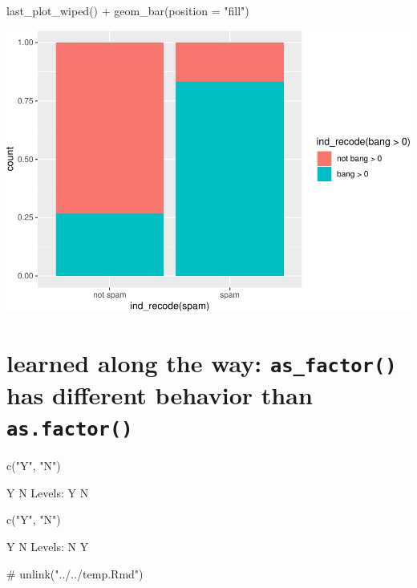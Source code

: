 \begin{Schunk}
\begin{Sinput}
{}

last_plot_wiped() +
  geom_bar(position = "fill")
\end{Sinput}

\includegraphics[width=0.69\linewidth]{r_journal_files/figure-latex/unnamed-chunk-19-2} \end{Schunk}

\hypertarget{learned-along-the-way-as_factor-has-different-behavior-than-as.factor}{%
\section{\texorpdfstring{learned along the way: \texttt{as\_factor()}
has different behavior than
\texttt{as.factor()}}{learned along the way: as\_factor() has different behavior than as.factor()}}\label{learned-along-the-way-as_factor-has-different-behavior-than-as.factor}}

\begin{Schunk}
\begin{Sinput}
c("Y", "N") %
\end{Sinput}
\begin{Soutput}
     [1] Y N
     Levels: Y N
\end{Soutput}
\begin{Sinput}
c("Y", "N") %
\end{Sinput}
\begin{Soutput}
     [1] Y N
     Levels: N Y
\end{Soutput}
\end{Schunk}

\begin{Schunk}
\begin{Sinput}
# unlink("../../temp.Rmd")
\end{Sinput}
\end{Schunk}

